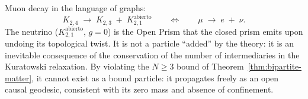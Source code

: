 \begin{result}[title={The neutrino is the topological scar}]
Muon decay in the language of graphs:
\[
  K_{2,4} \;\longrightarrow\; K_{2,3} \;+\; K_{2,1}^{\mathrm{abierto}}
  \qquad\Longleftrightarrow\qquad
  \mu \;\longrightarrow\; e \;+\; \nu.
\]
The neutrino ($K_{2,1}^{\mathrm{abierto}}$, $g = 0$) is the Open
Prism that the closed prism emits upon undoing its topological twist.
It is not a particle ``added'' by the theory: it is an
inevitable consequence of the conservation of the number of intermediaries
in the Kuratowski relaxation. By violating the $N \geq 3$ bound of
Theorem~\ref{thm:bipartite-matter}, it cannot exist as a bound
particle: it propagates freely as an open causal geodesic, consistent
with its zero mass and absence of confinement.
\end{result}


